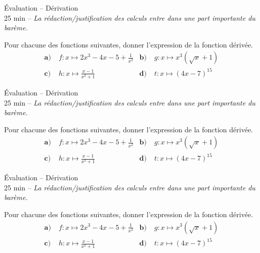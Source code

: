 \documentclass[11pt]{article}
\begin{document}
%
%
%

\begin{center}
  {\Huge Évaluation -- Dérivation}\\
  25 min -- \emph{La rédaction/justification des calculs entre dans une part
  importante du barème.}
\end{center}

\noindent Pour chacune des fonctions suivantes, donner l'expression de la fonction
dérivée.
\begin{align*}
  \textbf{a)}\; & f:x\mapsto 2x^3-4x-5+\frac{1}{x^2} &
  \textbf{b)}\; & g:x\mapsto x^3(\sqrt x+1) \\
  \textbf{c)}\; & h:x\mapsto \frac{x-1}{x^2+1} &
  \textbf{d)}\; & t:x\mapsto (4x-7)^{15}
\end{align*}
\vspace{2cm}

\begin{center}
  {\Huge Évaluation -- Dérivation}\\
  25 min -- \emph{La rédaction/justification des calculs entre dans une part
  importante du barème.}
\end{center}

\noindent Pour chacune des fonctions suivantes, donner l'expression de la fonction
dérivée.
\begin{align*}
  \textbf{a)}\; & f:x\mapsto 2x^3-4x-5+\frac{1}{x^2} &
  \textbf{b)}\; & g:x\mapsto x^3(\sqrt x+1) \\
  \textbf{c)}\; & h:x\mapsto \frac{x-1}{x^2+1} &
  \textbf{d)}\; & t:x\mapsto (4x-7)^{15}
\end{align*}
\vspace{2cm}

\begin{center}
  {\Huge Évaluation -- Dérivation}\\
  25 min -- \emph{La rédaction/justification des calculs entre dans une part
  importante du barème.}
\end{center}

\noindent Pour chacune des fonctions suivantes, donner l'expression de la fonction
dérivée.
\begin{align*}
  \textbf{a)}\; & f:x\mapsto 2x^3-4x-5+\frac{1}{x^2} &
  \textbf{b)}\; & g:x\mapsto x^3(\sqrt x+1) \\
  \textbf{c)}\; & h:x\mapsto \frac{x-1}{x^2+1} &
  \textbf{d)}\; & t:x\mapsto (4x-7)^{15}
\end{align*}
\vspace{2cm}
\end{document}
